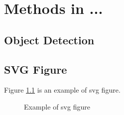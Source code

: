 \chapter{Methods in ...}

\section{Object Detection}








\section{SVG Figure}
Figure \ref{fig:example_svg} is an example of svg figure.

\begin{figure}[H]
  \centering
  
  \caption{Example of svg figure}
  \label{fig:example_svg}
\end{figure}
